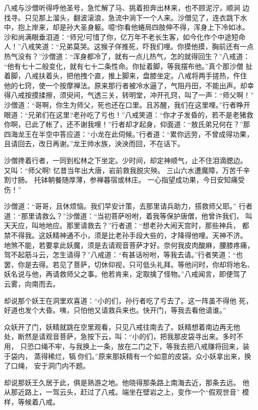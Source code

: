 八戒与沙僧听得呼他圣号，急忙解了马、挑着担奔出林来，也不顾泥泞，顺涧
边找寻。只见那上溜头，翻波滚浪，急流中淌下一个人来。沙僧见了，连衣跳下水
中，抱上岸来，却是孙大圣身躯。噫!你看他蜷局四肢伸不得，浑身上下冷如冰。
沙和尚满眼垂泪道：“师兄!可惜了你，亿万年不老长生客，如今化作个中途短命
人！”八戒笑道：“兄弟莫哭。这猴子佯推死，吓我们哩。你摸他摸，胸前还有一点
热气没有？”沙僧道：“浑身都冷了，就有一点儿热气，怎的就得回生？”八戒道：
“他有七十二般变化，就有七十二条性命。你扯着脚，等我摆布他。”真个那沙僧
扯着脚，八戒扶着头，把他拽个直，推上脚来，盘膝坐定。八戒将两手搓热，仵住
他的七窍，使一个按摩禅法。原来那行者被冷水逼了，气阻丹田，不能出声。却幸
得八戒按摸揉擦，须臾间，气透三关，转明堂，冲开孔窍，叫了一声：“师父啊！”
沙僧道：“哥啊，你生为师父，死也还在口里。且苏醒，我们在这里哩。”行者睁开
眼道：“兄弟们在这里?老孙吃了亏也！”八戒笑道：“你才子发昏的，若不是老猪救
你啊，已此了帐了，还不谢我哩！”行者却才起身，仰面道：“敖氏弟兄何在？”那
四海龙王在半空中答应道：“小龙在此伺候。”行者道：“累你远劳，不曾成得功果，
且请回去，改日再谢。”龙王帅水族，泱泱而回，不在话下。

沙僧搀着行者，一同到松林之下坐定。少时间，却定神顺气，止不住泪滴腮边。
又叫：“师父啊!
忆昔当年出大唐，岩前救我脱灾殃。
三山六水遭魔障，万苦千辛割寸肠。
托钵朝餐随厚薄，参禅暮宿或林庄。
一心指望成功果，今日安知痛受伤！”

沙僧道：“哥哥，且休烦恼。我们早安计策，去那里请兵助力，搭救师父耶。”
行者道：“那里请救么？”沙僧道：“当初菩萨吩咐，着我等保护唐僧，他曾许我们，
叫天天应，叫地地应。那里请救去？”行者道：“想老孙大闹天宫时，那些神兵，
都禁不得我。这妖精神通不小，须是比老孙手段大些的，才降得他哩。天神不济。
地煞不能，若要拿此妖魔，须是去请观音菩萨才好。奈何我皮肉酸麻，腰膝疼痛，
驾不起筋斗云，怎生请得？”八戒道：“有甚话吩咐，等我去请。”行者笑道：“也
罢，你是去得。若见了菩萨，切休仰视，只可低头礼拜。等他问时，你却将地名、
妖名说与他，再请救师父之事。他若肯来，定取擒了怪物。”八戒闻言，即便驾了
云雾，向南而去。

却说那个妖王在洞里欢喜道：“小的们，孙行者吃了亏去了。这一阵虽不得他
死，好道也发个大昏。咦，只怕他又请救兵来也。快开门，等我去看他请谁。”

众妖开了门，妖精就跳在空里观看，只见八戒往南去了。妖精想着南边再无他
处，断然是请观音菩萨，急按下云，叫：“小的们，把我那皮袋寻出来。多时不用，
只恐口绳不牢，与我换上一条，放在二门之下，等我去把八戒赚将回来，装于袋内，
蒸得稀烂，犒你们。”原来那妖精有一个如意的皮袋。众小妖拿出来，换了口绳，
安于洞门内不题。

却说那妖王久居于此，俱是熟游之地。他晓得那条路上南海去近，那条去远。
他从那近路上，一驾云头，赶过了八戒。端坐在壁岩之上，变作一个“假观世音”
模样，等候着八戒。

